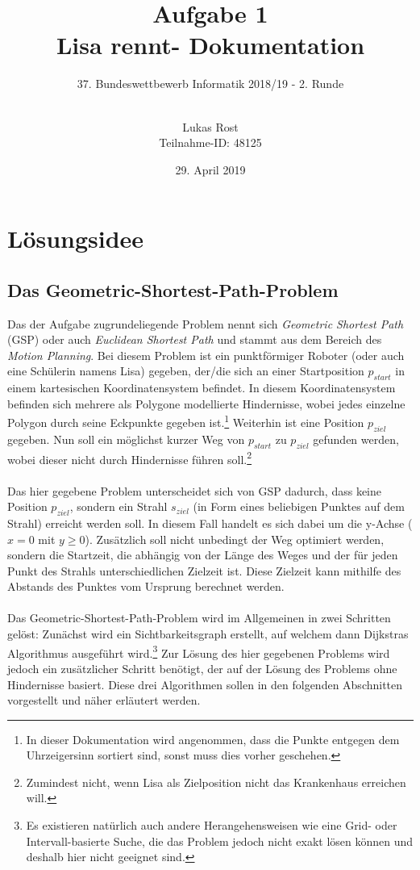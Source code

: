 \documentclass[a4paper, notitlepage, 12pt]{scrartcl}
\author{Lukas Rost \\ \small{Teilnahme-ID: 48125}}
\title{Aufgabe 1 \\ \glqq Lisa rennt\grqq  - Dokumentation}
\subtitle{37. Bundeswettbewerb Informatik 2018/19 - 2. Runde \\~\\}
\date{29. April 2019}
\begin{document}
\renewcommand{\contentsname}{\centerline{Inhaltsverzeichnis}}
 \maketitle
 \tableofcontents
 \setcounter{page}{1}
 
 \section{Lösungsidee}
 \subsection{Das Geometric-Shortest-Path-Problem}
 Das der Aufgabe zugrundeliegende Problem nennt sich \textit{Geometric Shortest Path} (GSP) oder auch  \textit{Euclidean Shortest Path} und stammt aus dem Bereich des \textit{Motion Planning}. Bei diesem Problem ist ein punktförmiger Roboter (oder auch eine Schülerin namens Lisa) gegeben, der/die sich an einer Startposition $p_{start}$ in einem kartesischen Koordinatensystem befindet. In diesem Koordinatensystem befinden sich mehrere als Polygone modellierte Hindernisse, wobei jedes einzelne Polygon durch seine Eckpunkte gegeben ist.\footnote{In dieser Dokumentation wird angenommen, dass die Punkte entgegen dem Uhrzeigersinn sortiert sind, sonst muss dies vorher geschehen.} Weiterhin ist eine Position $p_{ziel}$ gegeben. Nun soll ein möglichst kurzer Weg von $p_{start}$ zu $p_{ziel}$ gefunden werden, wobei dieser nicht durch Hindernisse führen soll.\footnote{Zumindest nicht, wenn Lisa als Zielposition nicht das Krankenhaus erreichen will.}\cite{Src:noem} \\ \\
 Das hier gegebene Problem unterscheidet sich von GSP dadurch, dass keine Position $p_{ziel}$, sondern ein Strahl $s_{ziel}$ (in Form eines beliebigen Punktes auf dem Strahl) erreicht werden soll. In diesem Fall handelt es sich dabei um die y-Achse ($x=0$ mit $y \geq 0$). Zusätzlich soll nicht unbedingt der Weg optimiert werden, sondern die Startzeit, die abhängig von der Länge des Weges und der für jeden Punkt des Strahls unterschiedlichen Zielzeit ist. Diese Zielzeit kann mithilfe des Abstands des Punktes vom Ursprung berechnet werden. \\ \\
 Das Geometric-Shortest-Path-Problem wird im Allgemeinen in zwei Schritten gelöst: Zunächst wird ein Sichtbarkeitsgraph erstellt, auf welchem dann Dijkstras Algorithmus ausgeführt wird.\footnote{Es existieren natürlich auch andere Herangehensweisen wie eine Grid- oder Intervall-basierte Suche, die das Problem jedoch nicht exakt lösen können und deshalb hier nicht geeignet sind.} Zur Lösung des hier gegebenen Problems wird jedoch ein zusätzlicher Schritt benötigt, der auf der Lösung des Problems ohne Hindernisse basiert. Diese drei Algorithmen sollen in den folgenden Abschnitten vorgestellt und näher erläutert werden.
\end{document}
